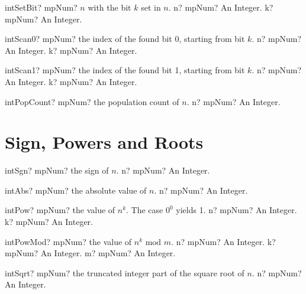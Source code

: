 \documentclass[12pt,a4paper,openany]{book}
\begin{document}
\begin{mpFunctionsExtract}
\mpFunctionTwo
{intSetBit? mpNum? $n$ with the bit $k$ set in $n$.}
{n? mpNum? An Integer.}
{k? mpNum? An Integer.}
\end{mpFunctionsExtract}

\begin{mpFunctionsExtract}
\mpFunctionTwo
{intScan0? mpNum? the index of the found bit 0, starting from bit $k$.}
{n? mpNum? An Integer.}
{k? mpNum? An Integer.}
\end{mpFunctionsExtract}

\begin{mpFunctionsExtract}
\mpFunctionTwo
{intScan1? mpNum? the index of the found bit 1, starting from bit $k$.}
{n? mpNum? An Integer.}
{k? mpNum? An Integer.}
\end{mpFunctionsExtract}

\begin{mpFunctionsExtract}
\mpFunctionOne
{intPopCount? mpNum? the population count of $n$.}
{n? mpNum? An Integer.}
\end{mpFunctionsExtract}

\section{Sign, Powers and Roots}

\begin{mpFunctionsExtract}
\mpFunctionOne
{intSgn? mpNum? the sign of $n$.}
{n? mpNum? An Integer.}
\end{mpFunctionsExtract}

\begin{mpFunctionsExtract}
\mpFunctionOne
{intAbs? mpNum? the absolute value of $n$.}
{n? mpNum? An Integer.}
\end{mpFunctionsExtract}

\begin{mpFunctionsExtract}
\mpFunctionTwo
{intPow? mpNum? the value of $n^k$. The case $0^0$ yields 1.}
{n? mpNum? An Integer.}
{k? mpNum? An Integer.}
\end{mpFunctionsExtract}

\begin{mpFunctionsExtract}
\mpFunctionThree
{intPowMod? mpNum? the value of $n^k \text{ mod } m$.}
{n? mpNum? An Integer.}
{k? mpNum? An Integer.}
{m? mpNum? An Integer.}
\end{mpFunctionsExtract}

\begin{mpFunctionsExtract}
\mpFunctionOne
{intSqrt? mpNum? the truncated integer part of the square root of $n$.}
{n? mpNum? An Integer.}
\end{mpFunctionsExtract}
\end{document}
